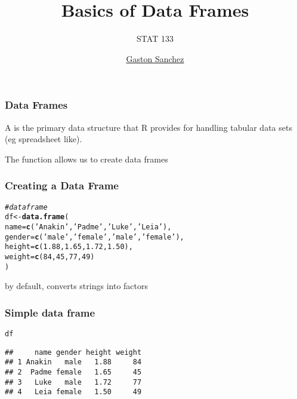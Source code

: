\documentclass[12pt]{beamer}\usepackage[]{graphicx}\usepackage[]{color}
\title{Basics of Data Frames}
\subtitle{STAT 133}
\author{\href{http://www.gastonsanchez.com}{Gaston Sanchez}}
\institute{\href{https://github.com/ucb-stat133/stat133-fall-2016}{\tt \scriptsize \color{foreground} github.com/ucb-stat133/stat133-fall-2016}}
\date{}
\makeatletter
\newcommand{\hlnum}[1]{\textcolor[rgb]{0.686,0.059,0.569}{#1}}%
\newcommand{\hlstr}[1]{\textcolor[rgb]{0.192,0.494,0.8}{#1}}%
\newcommand{\hlcom}[1]{\textcolor[rgb]{0.678,0.584,0.686}{\textit{#1}}}%
\newcommand{\hlstd}[1]{\textcolor[rgb]{0.345,0.345,0.345}{#1}}%
\newcommand{\hlkwb}[1]{\textcolor[rgb]{0.69,0.353,0.396}{#1}}%
\newcommand{\hlkwc}[1]{\textcolor[rgb]{0.333,0.667,0.333}{#1}}%
\newcommand{\hlkwd}[1]{\textcolor[rgb]{0.737,0.353,0.396}{\textbf{#1}}}%
\newenvironment{kframe}{%
 \def\at@end@of@kframe{}%
 \ifinner\ifhmode%
  \def\at@end@of@kframe{\end{minipage}}%
  \begin{minipage}{\columnwidth}%
 \fi\fi%
 \def\FrameCommand##1{\hskip\@totalleftmargin \hskip-\fboxsep
 \colorbox{shadecolor}{##1}\hskip-\fboxsep
     \hskip-\linewidth \hskip-\@totalleftmargin \hskip\columnwidth}%
 \MakeFramed {\advance\hsize-\width
   \@totalleftmargin\z@ \linewidth\hsize
   \@setminipage}}%
 {\par\unskip\endMakeFramed%
 \at@end@of@kframe}
\newenvironment{knitrout}{}{} %
\makeatother
\begin{document}
{
  \frame{
    \titlepage
  } 
}


\begin{frame}
\frametitle{Data Frames}

A {\hilit {}} is the primary data structure that R provides for handling tabular data sets (eg spreadsheet like).
\eb

The {\hilit {}} function allows us to create data frames 
\eb

\end{frame}


\begin{frame}[fragile]
\frametitle{Creating a Data Frame}

\begin{knitrout}\footnotesize
{}\color{fgcolor}\begin{kframe}
\begin{alltt}
\hlcom{# data frame}
\hlstd{df} \hlkwb{<-} \hlkwd{data.frame}\hlstd{(}
  \hlkwc{name} \hlstd{=} \hlkwd{c}\hlstd{(}\hlstr{'Anakin'}\hlstd{,} \hlstr{'Padme'}\hlstd{,} \hlstr{'Luke'}\hlstd{,} \hlstr{'Leia'}\hlstd{),}
  \hlkwc{gender} \hlstd{=} \hlkwd{c}\hlstd{(}\hlstr{'male'}\hlstd{,} \hlstr{'female'}\hlstd{,} \hlstr{'male'}\hlstd{,} \hlstr{'female'}\hlstd{),}
  \hlkwc{height} \hlstd{=} \hlkwd{c}\hlstd{(}\hlnum{1.88}\hlstd{,} \hlnum{1.65}\hlstd{,} \hlnum{1.72}\hlstd{,} \hlnum{1.50}\hlstd{),}
  \hlkwc{weight} \hlstd{=} \hlkwd{c}\hlstd{(}\hlnum{84}\hlstd{,} \hlnum{45}\hlstd{,} \hlnum{77}\hlstd{,} \hlnum{49}\hlstd{)}
\hlstd{)}
\end{alltt}
\end{kframe}
\end{knitrout}

by default,  converts strings into factors

\end{frame}


\begin{frame}[fragile]
\frametitle{Simple data frame }

\begin{knitrout}\footnotesize
{}\color{fgcolor}\begin{kframe}
\begin{alltt}
\hlstd{df}
\end{alltt}
\begin{verbatim}
##     name gender height weight
## 1 Anakin   male   1.88     84
## 2  Padme female   1.65     45
## 3   Luke   male   1.72     77
## 4   Leia female   1.50     49
\end{verbatim}
\end{kframe}
\end{knitrout}

\end{frame}
\end{document}

